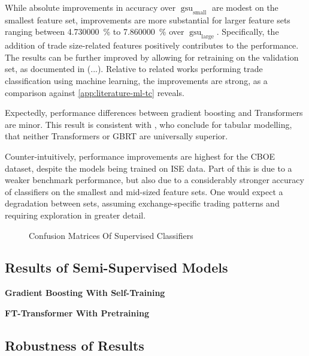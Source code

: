 While absolute improvements in accuracy over $\operatorname{gsu}_{\mathrm{small}}$ are modest on the smallest feature set, improvements are more substantial for larger feature sets ranging between \SI{4.730000}{\percent} to \SI{7.860000}{\percent} over $\operatorname{gsu}_{\mathrm{large}}$. Specifically, the addition of trade size-related features positively contributes to the performance. The results can be further improved by allowing for retraining on the validation set, as documented in (...). Relative to related works performing trade classification using machine learning, the improvements are strong, as a comparison against \cref{app:literature-ml-tc} reveals.

Expectedly, performance differences between gradient boosting and Transformers are minor. This result is consistent with \textcites{grinsztajnWhyTreebasedModels2022}{gorishniyRevisitingDeepLearning2021}, who conclude for tabular modelling, that neither Transformers or \gls{GBRT} are universally superior. 

Counter-intuitively, performance improvements are highest for the \gls{CBOE} dataset, despite the models being trained on \gls{ISE} data. Part of this is due to a weaker benchmark performance, but also due to a considerably stronger accuracy of classifiers on the smallest and mid-sized feature sets. One would expect a degradation between sets, assuming exchange-specific trading patterns and requiring exploration in greater detail.

\begin{figure}[!h]
    \vfill
    \caption[]{Confusion Matrices Of Supervised Classifiers}
    \label{fig:confusion-matrix-supervised-ise-cboe}
\end{figure}

\subsection{Results of Semi-Supervised
    Models}\label{sec:results-of-semi-supervised-models}



\textbf{Gradient Boosting With Self-Training}

\textbf{FT-Transformer With Pretraining}

\subsection{Robustness of Results}\label{sec:robustness-checks}

